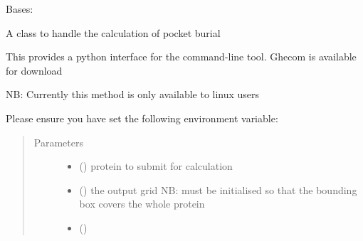 \documentclass[letterpaper,10pt,english]{sphinxmanual}
\begin{document}
\begin{fulllineitems}
\label{\detokenize{calculation_api:hotspots.calculation.Buriedness}}
Bases: 

A class to handle the calculation of pocket burial

This provides a python interface for the command-line tool.
Ghecom is available for download 

NB: Currently this method is only available to linux users

Please ensure you have set the following environment variable:

\begin{sphinxVerbatim}[commandchars=\\\{\}]
 
\end{sphinxVerbatim}
\begin{quote}\begin{description}
\item[{Parameters}] \leavevmode\begin{itemize}
\item {} 
 () \textendash{} protein to submit for calculation

\item {} 
 () \textendash{} the output grid NB: must be initialised so that the bounding box covers the whole protein

\item {} 
 () \textendash{} 

\end{itemize}

\end{description}\end{quote}


\end{fulllineitems}
\end{document}
